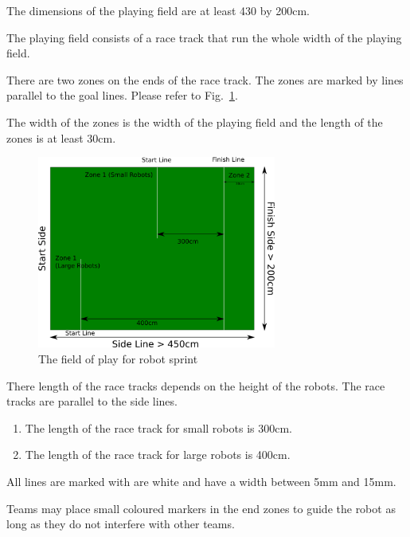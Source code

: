 \documentclass[12pt]{hurocup}
\begin{document}
\begin{lawlist}[RD]

\item The dimensions of the playing field are at least 430 by
  200cm. 
  
\item The playing field consists of a race track that run the whole
  width of the playing field.

\item There are two zones on the ends of the race track. The zones are
  marked by lines parallel to the goal lines. Please refer to
  Fig.~\ref{fig:sprint}.

\item The width of the zones is the width of the playing field and the
  length of the zones is at least 30cm.
  \begin{figure}
    \begin{center}
      \includegraphics[width=0.7\textwidth]{Figures/sprint}
    \end{center}
    \caption{The field of play for robot sprint}
    \label{fig:sprint}
  \end{figure}
  
\item There length of the race tracks depends on the height of the
  robots. The race tracks are parallel to the side lines.
  \begin{enumerate}
  \item The length of the race track for small robots
    is 300cm.
  \item The length of the race track for large robots
    is 400cm.
  \end{enumerate}

\item All lines are marked with are white and have a width between 5mm
  and 15mm.
  
\item Teams may place small coloured markers in the end zones to guide
  the robot as long as they do not interfere with other teams.
\end{lawlist}
\end{document}
